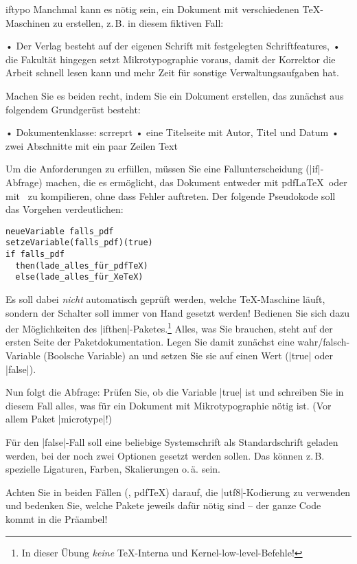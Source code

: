 \documentclass[
	blatt=11,
	ausgabe=25.\,06.\,2010,
	rückgabe=02.\,07.\,2010
]{lcourse-hd}
\begin{document}
\begin{exercise}[
  name=Typographie auf Anfrage,
  punkte=7,
  abgabe = Quelltext per Mail und ausgedruckt. Fertige Dokumente als pdf per Mail.
]{iftypo}
Manchmal kann es nötig sein, ein Dokument mit verschiedenen \TeX-Maschinen zu erstellen, z.\,B. in diesem fiktiven Fall:

• Der Verlag besteht auf der eigenen Schrift mit festgelegten Schriftfeatures,
• die Fakultät hingegen setzt Mikrotypographie voraus, damit der Korrektor die Arbeit schnell lesen kann und mehr Zeit für sonstige Verwaltungsaufgaben hat.

Machen Sie es beiden recht, indem Sie ein Dokument erstellen, das zunächst aus folgendem Grundgerüst besteht:

• Dokumentenklasse: scrreprt
• eine Titelseite mit Autor, Titel und Datum
• zwei Abschnitte mit ein paar Zeilen Text

Um die Anforderungen zu erfüllen, müssen Sie eine Fallunterscheidung (|if|-Abfrage) machen, die es ermöglicht, das Dokument entweder mit pdf\LaTeX\ oder mit \XeLaTeX\ zu kompilieren, ohne dass Fehler auftreten. Der folgende Pseudokode soll das Vorgehen verdeutlichen:
\begin{verbatim}
neueVariable falls_pdf
setzeVariable(falls_pdf)(true)
if falls_pdf
  then(lade_alles_für_pdfTeX)
  else(lade_alles_für_XeTeX)
\end{verbatim}
Es soll dabei \emph{nicht} automatisch geprüft werden, welche \TeX-Maschine läuft, sondern der Schalter soll immer von Hand gesetzt werden! Bedienen Sie sich dazu der Möglichkeiten des |ifthen|-Paketes.\footnote{In dieser Übung \emph{keine} \TeX-Interna und Kernel-low-level-Befehle!} Alles, was Sie brauchen, steht auf der ersten Seite der Paketdokumentation. Legen Sie damit zunächst eine wahr/falsch-Variable (Boolsche Variable) an und setzen Sie sie auf einen Wert (|true| oder |false|).

Nun folgt die Abfrage: Prüfen Sie, ob die Variable |true| ist und schreiben Sie in diesem Fall alles, was für ein Dokument mit Mikrotypographie nötig ist. (Vor allem Paket |microtype|!)

Für den |false|-Fall soll eine beliebige Systemschrift als Standardschrift geladen werden, bei der noch zwei Optionen gesetzt werden sollen. Das können z.\,B. spezielle Ligaturen, Farben, Skalierungen o.\,ä. sein.

Achten Sie in beiden Fällen (\XeTeX, pdf\TeX) darauf, die |utf8|-Kodierung zu verwenden und bedenken Sie, welche Pakete jeweils dafür nötig sind – der ganze Code kommt in die Präambel!

\end{exercise}
\end{document}
